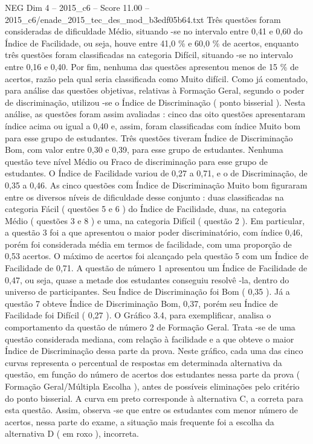 \begin{textsample}{NEG Dim 4 – 2015\_c6 – Score 11.00 – 2015\_c6/enade\_2015\_tec\_des\_mod\_b3edf05b64.txt}
Três questões foram consideradas de dificuldade Médio, situando -se no intervalo entre 0,41 e 0,60 do Índice de Facilidade, ou seja, houve entre 41,0 \% e 60,0 \% de acertos, enquanto três questões foram classificadas na categoria Difícil, situando -se no intervalo entre 0,16 e 0,40.
Por fim, nenhuma das questões apresentou menos de 15 \% de acertos, razão pela qual seria classificada como Muito difícil.
Como já comentado, para análise das questões objetivas, relativas à Formação Geral, segundo o poder de discriminação, utilizou -se o Índice de Discriminação ( ponto bisserial ).
Nesta análise, as questões foram assim avaliadas : cinco das oito questões apresentaram índice acima ou igual a 0,40 e, assim, foram classificadas com índice Muito bom para esse grupo de estudantes.
Três questões tiveram Índice de Discriminação Bom, com valor entre 0,30 e 0,39, para esse grupo de estudantes.
Nenhuma questão teve nível Médio ou Fraco de discriminação para esse grupo de estudantes.
O Índice de Facilidade variou de 0,27 a 0,71, e o de Discriminação, de 0,35 a 0,46.
As cinco questões com Índice de Discriminação Muito bom figuraram entre os diversos níveis de dificuldade desse conjunto : duas classificadas na categoria Fácil ( questões 5 e 6 ) do Índice de Facilidade, duas, na categoria Médio ( questões 3 e 8 ) e uma, na categoria Difícil ( questão 2 ).
Em particular, a questão 3 foi a que apresentou o maior poder discriminatório, com índice 0,46, porém foi considerada média em termos de facilidade, com uma proporção de 0,53 acertos.
O máximo de acertos foi alcançado pela questão 5 com um Índice de Facilidade de 0,71.
A questão de número 1 apresentou um Índice de Facilidade de 0,47, ou seja, quase a metade dos estudantes conseguiu resolvê -la, dentro do universo de participantes.
Seu Índice de Discriminação foi Bom ( 0,35 ).
Já a questão 7 obteve Índice de Discriminação Bom, 0,37, porém seu Índice de Facilidade foi Difícil ( 0,27 ).
O Gráfico 3.4, para exemplificar, analisa o comportamento da questão de número 2 de Formação Geral.
Trata -se de uma questão considerada mediana, com relação à facilidade e a que obteve o maior Índice de Discriminação dessa parte da prova.
Neste gráfico, cada uma das cinco curvas representa o percentual de respostas em determinada alternativa da questão, em função do número de acertos dos estudantes nessa parte da prova ( Formação Geral/Múltipla Escolha ), antes de possíveis eliminações pelo critério do ponto bisserial.
A curva em preto corresponde à alternativa C, a correta para esta questão.
Assim, observa -se que entre os estudantes com menor número de acertos, nessa parte do exame, a situação mais frequente foi a escolha da alternativa D ( em roxo ), incorreta.

\end{textsample}
